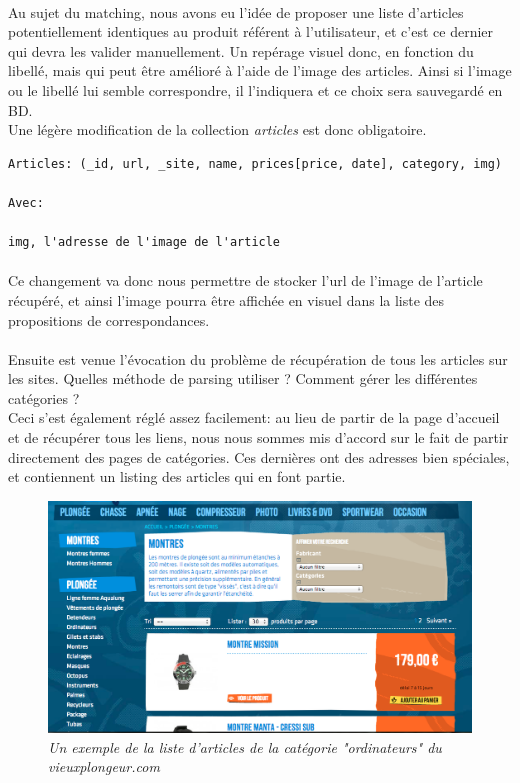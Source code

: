 \documentclass{report}
\begin{document}
\paragraph{}
Au sujet du matching, nous avons eu l'idée de proposer une liste d'articles potentiellement identiques au produit référent à l'utilisateur, et c'est ce dernier qui devra les valider manuellement. Un repérage visuel donc, en fonction du libellé, mais qui peut être amélioré à l'aide de l'image des articles. Ainsi si l'image ou le libellé lui semble correspondre, il l'indiquera et ce choix sera sauvegardé en BD.\\
Une légère modification de la collection \textit{articles} est donc obligatoire.

\begin{lstlisting}
Articles: (_id, url, _site, name, prices[price, date], category, img)

Avec:

img, l'adresse de l'image de l'article

\end{lstlisting}

\paragraph{}
Ce changement va donc nous permettre de stocker l'url de l'image de l'article récupéré, et ainsi l'image pourra être affichée en visuel dans la liste des propositions de correspondances.

\paragraph{}
Ensuite est venue l'évocation du problème de récupération de tous les articles sur les sites. Quelles méthode de parsing utiliser ? Comment gérer les différentes catégories ?\\
Ceci s'est également réglé assez facilement: au lieu de partir de la page d'accueil et de récupérer tous les liens, nous nous sommes mis d'accord sur le fait de partir directement des pages de catégories. Ces dernières ont des adresses bien spéciales, et contiennent un listing des articles qui en font partie.

\begin{figure}[H]
\begin{center}
\includegraphics[scale=0.4]{vp.png}
\caption{\textit{Un exemple de la liste d'articles de la catégorie "ordinateurs" du vieuxplongeur.com}}
\end{center}
\end{figure}
\end{document}

